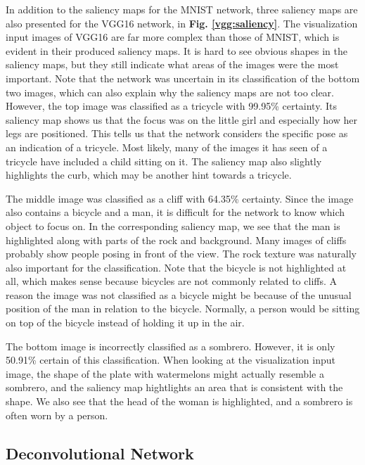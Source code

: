 \noindent In addition to the saliency maps for the MNIST network, three saliency maps are also presented for the VGG16 network, in \textbf{Fig. \ref{vgg:saliency}}. The visualization input images of VGG16 are far more complex than those of MNIST, which is evident in their produced saliency maps. It is hard to see obvious shapes in the saliency maps, but they still indicate what areas of the images were the most important. Note that the network was uncertain in its classification of the bottom two images, which can also explain why the saliency maps are not too clear. However, the top image was classified as a tricycle with 99.95\% certainty. Its saliency map shows us that the focus was on the little girl and especially how her legs are positioned. This tells us that the network considers the specific pose as an indication of a tricycle. Most likely, many of the images it has seen of a tricycle have included a child sitting on it. The saliency map also slightly highlights the curb, which may be another hint towards a tricycle. 

The middle image was classified as a cliff with 64.35\% certainty. Since the image also contains a bicycle and a man, it is difficult for the network to know which object to focus on. In the corresponding saliency map, we see that the man is highlighted along with parts of the rock and background. Many images of cliffs probably show people posing in front of the view. The rock texture was naturally also important for the classification. Note that the bicycle is not highlighted at all, which makes sense because bicycles are not commonly related to cliffs. A reason the image was not classified as a bicycle might be because of the unusual position of the man in relation to the bicycle. Normally, a person would be sitting on top of the bicycle instead of holding it up in the air.

The bottom image is incorrectly classified as a sombrero. However, it is only 50.91\% certain of this classification. When looking at the visualization input image, the shape of the plate with watermelons might actually resemble a sombrero, and the saliency map hightlights an area that is consistent with the shape. We also see that the head of the woman is highlighted, and a sombrero is often worn by a person.

\subsection{Deconvolutional Network}


